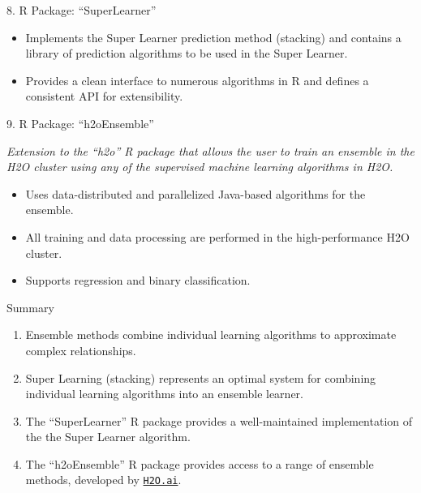 \documentclass[12pt,t,handout]{beamer}
\begin{document}
\begin{frame}[c]{8. R Package: ``SuperLearner''}

\vspace*{3mm}

\centering

  \begin{itemize}
    \itemsep12pt
    \item Implements the Super Learner prediction method (stacking) and
          contains a library of prediction algorithms to be used in the Super
          Learner.
    \item Provides a clean interface to numerous algorithms in R and defines a
          consistent API for extensibility.
  \end{itemize}

\note{
}
\end{frame}


\begin{frame}{9. R Package: ``h2oEnsemble''}

\vspace*{3mm}

\centering

\textit{Extension to the ``h2o'' R package that allows the user to train an
ensemble in the H2O cluster using any of the supervised machine learning
algorithms in H2O.}

\vspace{1em}

  \begin{itemize}
    \itemsep12pt
    \item Uses data-distributed and parallelized Java-based algorithms for the
          ensemble.
    \item All training and data processing are performed in the
          high-performance H2O cluster.
    \item Supports regression and binary classification.
  \end{itemize}

\note{
}
\end{frame}


\begin{frame}[c]{Summary}

  \begin{enumerate}
  \itemsep12pt
    \item Ensemble methods combine individual learning algorithms to approximate
          complex relationships.
    \item Super Learning (stacking) represents an optimal system for combining
          individual learning algorithms into an ensemble learner.
    \item The ``SuperLearner'' R package provides a well-maintained
          implementation of the the Super Learner algorithm.
    \item The ``h2oEnsemble'' R package provides access to a range of ensemble
          methods, developed by \href{http://www.h2o.ai}{\tt H2O.ai}.
  \end{enumerate}

\end{frame}
\end{document}
